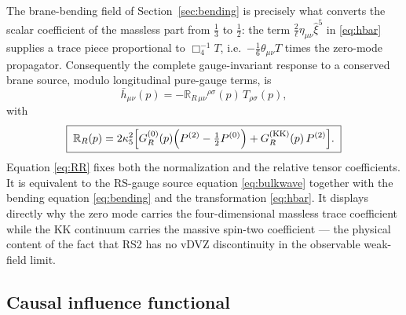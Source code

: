 \documentclass[11pt,a4paper]{article}
\theoremstyle{plain}
\theoremstyle{definition}
\newcommand{\kfive}{\kappa_5}
\newcommand{\KK}{\mathrm{KK}}
\begin{document}
The brane-bending field of Section~\ref{sec:bending} is precisely what
converts the scalar coefficient of the massless part from $\tfrac13$ to
$\tfrac12$: the term $\tfrac{2}{\ell}\eta_{\mu\nu}\hat\xi^5$ in
\eqref{eq:hbar} supplies a trace piece proportional to
$\Box_4^{-1}T$, i.e.\ $-\tfrac16\theta_{\mu\nu}T$ times the zero-mode
propagator. Consequently the complete gauge-invariant response to a
conserved brane source, modulo longitudinal pure-gauge terms, is
\begin{equation}
\label{eq:response}
\boxed{\;
\bar h_{\mu\nu}(p)
=-\mathbb R_{R\,\mu\nu}{}^{\rho\sigma}(p)\,T_{\rho\sigma}(p),
\;}
\end{equation}
with
\begin{equation}
\label{eq:RR}
\boxed{\;
\mathbb R_R(p)
=2\kfive^2\Bigl[
G_R^{(0)}(p)\Bigl(P^{(2)}-\tfrac12P^{(0)}\Bigr)
+G_R^{(\KK)}(p)\,P^{(2)}
\Bigr].
\;}
\end{equation}
Equation \eqref{eq:RR} fixes both the normalization and the relative
tensor coefficients. It is equivalent to the RS-gauge source equation
\eqref{eq:bulkwave} together with the bending equation
\eqref{eq:bending} and the transformation \eqref{eq:hbar}. It displays
directly why the zero mode carries the four-dimensional massless trace
coefficient while the KK continuum carries the massive spin-two
coefficient --- the physical content of the fact that RS2 has no vDVZ
discontinuity in the observable weak-field limit.

\subsection{Causal influence functional}
\label{sec:ctp}
\end{document}
